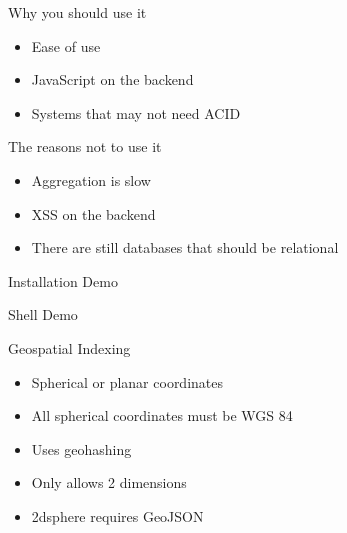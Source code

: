 \documentclass{beamer}
\begin{document}
\begin{frame}{Why you should use it}

\begin{itemize}
\item Ease of use
\item JavaScript on the backend
\item Systems that may not need ACID
\end{itemize}

\end{frame}


\begin{frame}{The reasons not to use it}

\begin{itemize}
\item Aggregation is slow
\item XSS on the backend
\item There are still databases that should be relational
\end{itemize}

\end{frame}


\begin{frame}

\begin{center}
   Installation Demo
\end{center}

\end{frame}


\begin{frame}

\begin{center}
   Shell Demo
\end{center}

\end{frame}


\begin{frame}{Geospatial Indexing}

\begin{itemize}
\item Spherical or planar coordinates
\item All spherical coordinates must be WGS 84
\item Uses geohashing
\item Only allows 2 dimensions
\item 2dsphere requires GeoJSON
\end{itemize}

\end{frame}
\end{document}
